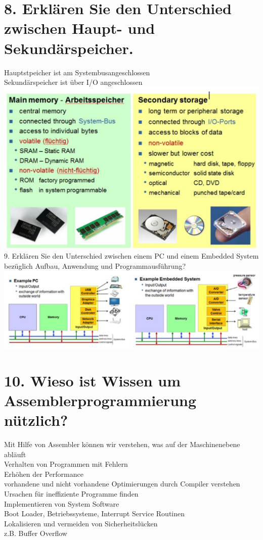 \documentclass[10pt]{article}
\begin{document}
\section*{8. Erklären Sie den Unterschied zwischen Haupt- und Sekundärspeicher.}
Hauptstpeicher ist am Systembusangeschlossen\\
Sekundärspeicher ist über I/O angeschlossen\\
\includegraphics[width=\linewidth]{images/2025_01_02_f240dc33b50f25226887g-3(2)}\\
9. Erklären Sie den Unterschied zwischen einem PC und einem Embedded System bezüglich Aufbau, Anwendung und Programmausführung?\\
\includegraphics[width=\linewidth]{images/2025_01_02_f240dc33b50f25226887g-4}

\section*{10. Wieso ist Wissen um Assemblerprogrammierung nützlich?}
Mit Hilfe von Assembler können wir verstehen, was auf der Maschinenebene abläuft\\
Verhalten von Programmen mit Fehlern\\
Erhöhen der Performance\\
vorhandene und nicht vorhandene Optimierungen durch Compiler verstehen\\
Ursachen für ineffiziente Programme finden\\
Implementieren von System Software\\
Boot Loader, Betriebssysteme, Interrupt Service Routinen\\
Lokalisieren und vermeiden von Sicherheitslücken\\
z.B. Buffer Overflow
\end{document}

